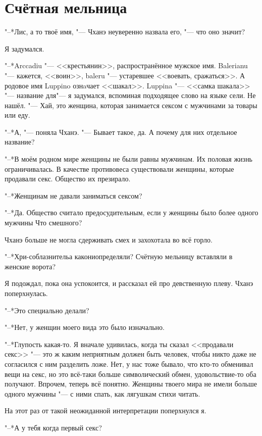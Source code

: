 \section{Счётная мельница}

"--*Лис, а то твоё имя, "--- Чханэ неуверенно назвала его, "--- что оно значит?

Я задумался.

"--*Arccadiu "--- <<крестьянин>>, распространённое мужское имя.
Balerianu "--- кажется, <<воин>>, baleru "--- устаревшее <<воевать, сражаться>>.
А родовое имя Luppino ознaчает <<шакал>>.
Luppina "--- <<самка шакала>> "--- название для\ldotst "--- я задумался, вспоминая подходящее слово на языке сели.
Не нашёл.
"--- Хай, это женщина, которая занимается сексом с мужчинами за товары или еду.

"--*А, "--- поняла Чханэ.
"--- Бывает такое, да.
А почему для них отдельное название?

"--*В моём родном мире женщины не были равны мужчинам.
Их половая жизнь ограничивалась.
В качестве противовеса существовали женщины, которые продавали секс.
Общество их презирало.

"--*Женщинам не давали заниматься сексом?

"--*Да.
Общество считало предосудительным, если у женщины было более одного мужчины\ldotst
Что смешного?

Чханэ больше не могла сдерживать смех и захохотала во всё горло.

"--*Хри-соблазнитель\ldotst а как\ldotst они\ldotst определяли?
Счётную мельницу вставляли в женские ворота?

Я подождал, пока она успокоится, и рассказал ей про девственную плеву.
Чханэ поперхнулась.

"--*Это специально делали?

"--*Нет, у женщин моего вида это было изначально.

"--*Глупость какая-то.
Я вначале удивилась, когда ты сказал <<продавали секс>> "--- это ж каким неприятным должен быть человек, чтобы никто даже не согласился с ним разделить ложе.
Нет, у нас тоже бывало, что кто-то обменивал вещи на секс, но это всё-таки больше символический обмен, удовольствие-то оба получают.
Впрочем, теперь всё понятно.
Женщины твоего мира не имели больше одного мужчины "--- с ними спать, как лягушкам стихи читать.

На этот раз от такой неожиданной интерпретации поперхнулся я.

"--*А у тебя когда первый секс?

